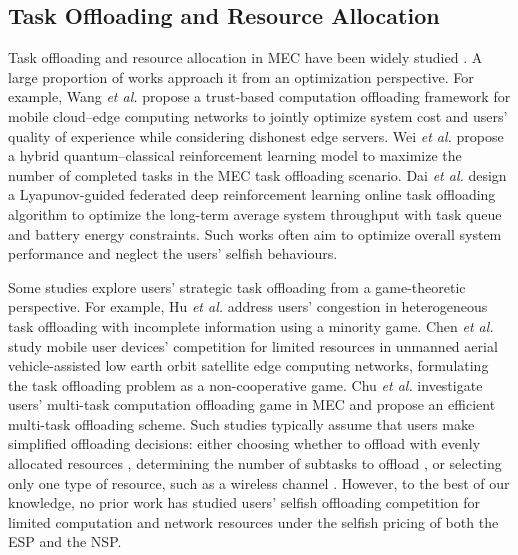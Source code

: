 \documentclass[lettersize,journal]{IEEEtran}
\newcommand{\etal}{\textit{et al.}}
\begin{document}
\subsection{Task Offloading and Resource Allocation}
Task offloading and resource allocation in MEC have been widely studied \cite{wang2025trust,wei2024quantum,dai2025throughput,hu2020heterogeneous,chen2024multi,chu2023efficient}. A large proportion of works approach it from an optimization perspective.
For example, Wang \etal \cite{wang2025trust} propose a trust-based computation offloading framework for mobile cloud–edge computing networks to jointly optimize system cost and users’ quality of experience while considering dishonest edge servers. 
Wei \etal \cite{wei2024quantum} propose a hybrid quantum–classical reinforcement learning model to maximize the number of completed tasks in the MEC task offloading scenario.
Dai \etal \cite{dai2025throughput} design a Lyapunov-guided federated deep reinforcement
learning online task offloading algorithm to optimize the long-term average system throughput with task queue and battery energy constraints. 
Such works often aim to optimize overall system performance and neglect the users' selfish behaviours.

Some studies explore users' strategic task offloading from a game-theoretic perspective. For example, Hu \etal \cite{hu2020heterogeneous} address users' congestion in heterogeneous task offloading with incomplete information using a minority game. 
Chen \etal \cite{chen2024multi} study mobile user devices' competition for limited resources in unmanned aerial vehicle-assisted low earth orbit satellite edge computing networks, formulating the task offloading problem as a non-cooperative game.
Chu \etal \cite{chu2023efficient} investigate users' multi-task computation offloading game in MEC and propose an efficient multi-task offloading scheme.
Such studies typically assume that users make simplified offloading decisions: either choosing whether to offload with evenly allocated resources \cite{chu2023efficient}, determining the number of subtasks to offload \cite{hu2020heterogeneous}, or selecting only one type of resource, such as a wireless channel \cite{chen2024multi}. 
However, to the best of our knowledge, no prior work has studied users' selfish offloading competition for limited computation and network resources under the selfish pricing of both the ESP and the NSP.
\end{document}

